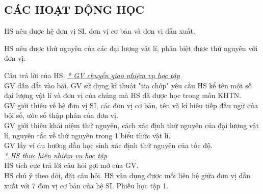 \subsection{CÁC HOẠT ĐỘNG HỌC}
{
HS nêu được hệ đơn vị SI, đơn vị cơ bản và đơn vị dẫn xuất.

HS nêu được thứ nguyên của các đại lượng vật lí, phân biệt được thứ nguyên với đơn vị.
}
{
Câu trả lời của HS.
}
{
\textit{\underline{* GV chuyển giao nhiệm vụ học tập}}\\
GV dẫn dắt vào bài. GV sử dụng kĩ thuật "tia chớp" yêu cầu HS kể tên một số đại lượng vật lí và đơn vị của chúng mà HS đã được học trong môn KHTN.\\
GV giới thiệu về hệ đơn vị SI, các đơn vị cơ bản, tên và kí hiệu tiếp đầu ngữ của bội số, ước số thập phân của đơn vị.\\
GV giới thiệu khái niệm thứ nguyên, cách xác định thứ nguyên của đại lượng vật lí, nguyên tắc về thứ nguyên trong 1 biểu thức vật lí.\\
GV lấy ví dụ hướng dẫn học sinh xác định thứ nguyên của tốc độ.\\
\textit{\underline{* HS thực hiện nhiệm vụ học tập}}\\
HS tích cực trả lời câu hỏi gợi mở của GV.\\
HS chú ý theo dõi, đặt câu hỏi.
}
{
HS vận dụng được mối liên hệ giữa đơn vị dẫn xuất với 7 đơn vị cơ bản của hệ SI.
}
{
Phiếu học tập 1.
}
